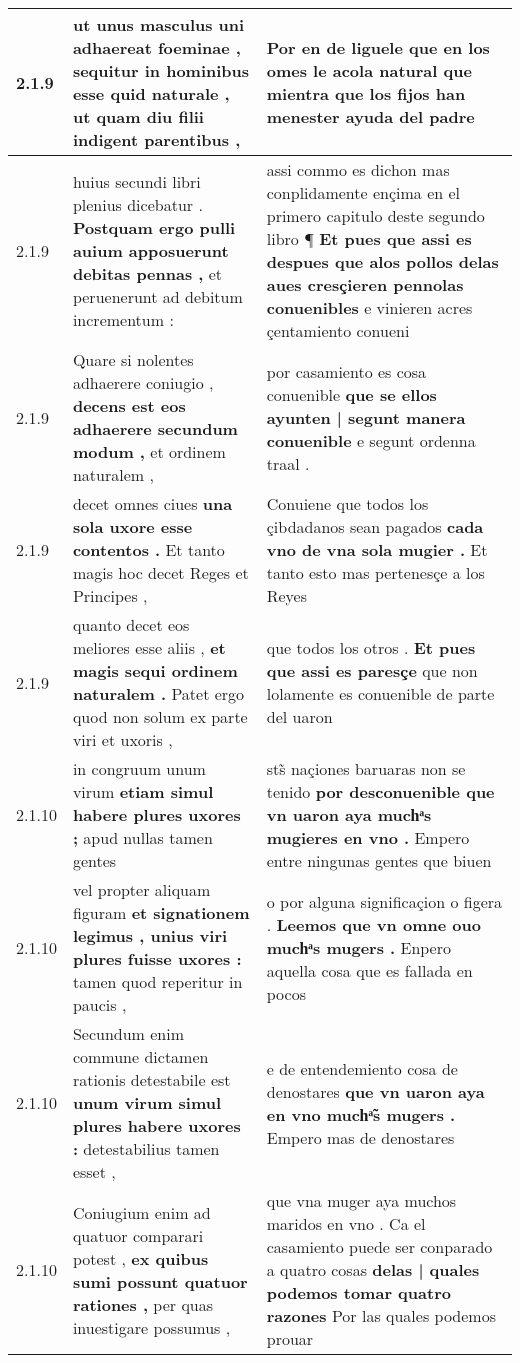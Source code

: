 \begin{tabular}{|p{1cm}|p{6.5cm}|p{6.5cm}|}
2.1.9 & ut unus masculus uni adhaereat foeminae , \textbf{ sequitur in hominibus esse quid naturale , } ut quam diu filii indigent parentibus , & Por en de liguele \textbf{ que en los omes le acola natural } que mientra que los fijos han menester ayuda del padre \\\hline
2.1.9 & huius secundi libri plenius dicebatur . \textbf{ Postquam ergo pulli auium apposuerunt debitas pennas , } et peruenerunt ad debitum incrementum : & assi commo es dichon mas conplidamente ençima en el primero capitulo deste segundo libro ¶ \textbf{ Et pues que assi es despues que alos pollos delas aues cresçieren pennolas conuenibles } e vinieren acres çentamiento conueni \\\hline
2.1.9 & Quare si nolentes adhaerere coniugio , \textbf{ decens est eos adhaerere secundum modum , } et ordinem naturalem , & por casamiento es cosa conuenible \textbf{ que se ellos ayunten | segunt manera conuenible } e segunt ordenna traal . \\\hline
2.1.9 & decet omnes ciues \textbf{ una sola uxore esse contentos . } Et tanto magis hoc decet Reges et Principes , & Conuiene que todos los çibdadanos sean pagados \textbf{ cada vno de vna sola mugier . } Et tanto esto mas pertenesçe a los Reyes \\\hline
2.1.9 & quanto decet eos meliores esse aliis , \textbf{ et magis sequi ordinem naturalem . } Patet ergo quod non solum ex parte viri et uxoris , & que todos los otros . \textbf{ Et pues que assi es paresçe } que non lolamente es conuenible de parte del uaron \\\hline
2.1.10 & in congruum unum virum \textbf{ etiam simul habere plures uxores ; } apud nullas tamen gentes & sts̃ naçiones baruaras non se tenido \textbf{ por desconuenible que vn uaron aya muchͣs mugieres en vno . } Empero entre ningunas gentes que biuen \\\hline
2.1.10 & vel propter aliquam figuram \textbf{ et signationem legimus , unius viri plures fuisse uxores : } tamen quod reperitur in paucis , & o por alguna significaçion o figera . \textbf{ Leemos que vn omne ouo muchͣs mugers . } Enpero aquella cosa que es fallada en pocos \\\hline
2.1.10 & Secundum enim commune dictamen rationis detestabile est \textbf{ unum virum simul plures habere uxores : } detestabilius tamen esset , & e de entendemiento cosa de denostares \textbf{ que vn uaron aya en vno muchͣ̃s mugers . } Empero mas de denostares \\\hline
2.1.10 & Coniugium enim ad quatuor comparari potest , \textbf{ ex quibus sumi possunt quatuor rationes , } per quas inuestigare possumus , & que vna muger aya muchos maridos en vno . Ca el casamiento puede ser conparado a quatro cosas \textbf{ delas | quales podemos tomar quatro razones } Por las quales podemos prouar \\\hline

\end{tabular}
